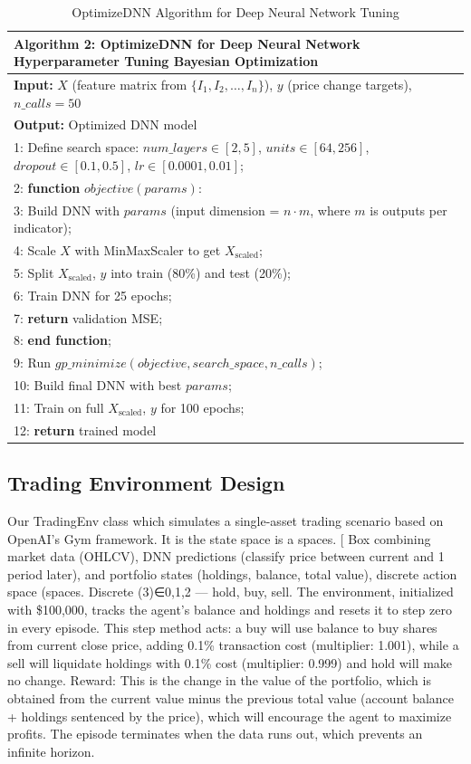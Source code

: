 \begin{table}[h]
\small
\centering
\begin{tabular}{|p{14cm}|}
\hline
\textbf{Algorithm 2: OptimizeDNN for Deep Neural Network Hyperparameter Tuning Bayesian Optimization} \\
\hline
\textbf{Input:} \( X \) (feature matrix from \( \{I_1, I_2, \ldots, I_n\} \)), \( y \) (price change targets), \( n\_calls=50 \) \\
\textbf{Output:} Optimized DNN model \\
\hline
1: Define search space: $num\_layers \in [2, 5]$, $units \in [64, 256]$, $dropout \in [0.1, 0.5]$, $lr \in [0.0001, 0.01]$; \\
2: \textbf{function} $objective(params)$: \\
3: \quad Build DNN with $params$ (input dimension = $n \cdot m$, where $m$ is outputs per indicator); \\
4: \quad Scale $X$ with MinMaxScaler to get $X_{\text{scaled}}$; \\
5: \quad Split $X_{\text{scaled}}$, $y$ into train (80\%) and test (20\%); \\
6: \quad Train DNN for 25 epochs; \\
7: \quad \textbf{return} validation MSE; \\
8: \textbf{end function}; \\
9: Run $gp\_minimize(objective, search\_space, n\_calls)$; \\
10: Build final DNN with best $params$; \\
11: Train on full $X_{\text{scaled}}$, $y$ for 100 epochs; \\
12: \textbf{return} trained model \\
\hline
\end{tabular}
\caption{OptimizeDNN Algorithm for Deep Neural Network Tuning}
\label{tab:optimizednn_algorithm}
\end{table}


\subsection{Trading Environment Design}
Our TradingEnv class which simulates a single-asset trading scenario based on OpenAI’s Gym framework. It is the state space is a spaces. [ Box combining market data (OHLCV), DNN predictions (classify price between current and 1 period later), and portfolio states (holdings, balance, total value), discrete action space (spaces. Discrete (3)∈{0,1,2} — hold, buy, sell. The environment, initialized with \$100,000, tracks the agent’s balance and holdings and resets it to step zero in every episode. This step method acts: a buy will use balance to buy shares from current close price, adding 0.1\% transaction cost (multiplier: 1.001), while a sell will liquidate holdings with 0.1\% cost (multiplier: 0.999) and hold will make no change. Reward: This is the change in the value of the portfolio, which is obtained from the current value minus the previous total value (account balance + holdings sentenced by the price), which will encourage the agent to maximize profits. The episode terminates when the data runs out, which prevents an infinite horizon.

